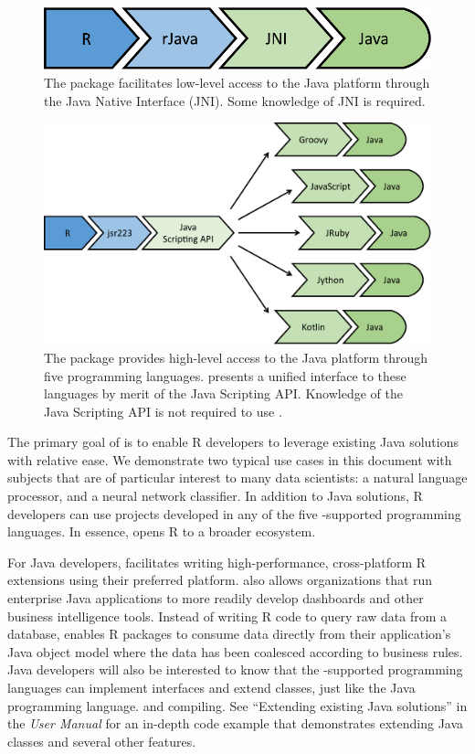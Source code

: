 \begin{figure}[h]
\centering
\includegraphics[width=0.40\linewidth]{scheme-rjava}
\caption{The  package facilitates low-level access to the Java platform through the Java Native Interface (JNI). Some knowledge of JNI is required.}
\label{fig:scheme-rjava}
\end{figure}

\begin{figure}[h]
\centering
\includegraphics[width=.72\linewidth]{scheme-jsr223}
\caption{The  package provides high-level access to the Java platform through five programming languages.  presents a unified interface to these languages by merit of the Java Scripting API. Knowledge of the Java Scripting API is not required to use .}
\label{fig:scheme-jsr223}
\end{figure}

The primary goal of  is to enable R developers to leverage existing Java solutions with relative ease. We demonstrate two typical use cases in this document with subjects that are of particular interest to many data scientists: a natural language processor, and a neural network classifier. In addition to Java solutions, R developers can use projects developed in any of the five -supported programming languages. In essence,  opens R to a broader ecosystem.

For Java developers,  facilitates writing high-performance, cross-platform R extensions using their preferred platform.  also allows organizations that run enterprise Java applications to more readily develop dashboards and other business intelligence tools. Instead of writing R code to query raw data from a database,  enables R packages to consume data directly from their application's Java object model where the data has been coalesced according to business rules. Java developers will also be interested to know that the -supported programming languages can implement interfaces and extend classes, just like the Java programming language. and compiling. See ``Extending existing Java solutions'' in the \textit{ User Manual} for an in-depth code example that demonstrates extending Java classes and several other features.

